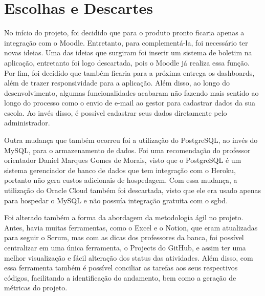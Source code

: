 \section{Escolhas e Descartes}
No início do projeto, foi decidido que para o produto pronto ficaria apenas a integração com o Moodle. Entretanto, para complementá-la, foi necessário ter novas ideias. Uma das ideias que surgiram foi inserir um sistema de boletim na aplicação, entretanto foi logo descartada, pois o Moodle já realiza essa função. Por fim, foi decidido que também ficaria para a próxima entrega os dashboards, além de trazer responsividade para a aplicação. Além disso, ao longo do desenvolvimento, algumas funcionalidades acabaram não fazendo mais sentido ao longo do processo como o envio de e-mail ao gestor para cadastrar dados da sua escola. Ao invés disso, é possível cadastrar seus dados diretamente pelo administrador. 

Outra mudança que também ocorreu foi a utilização do PostgreSQL, ao invés do MySQL, para o armazenamento de dados. Foi uma recomendação do professor orientador Daniel Marques Gomes de Morais, visto que o PostgreSQL é um sistema gerenciador de banco de dados que tem integração com o Heroku, portanto não gera custos adicionais de hospedagem. Com essa mudança, a utilização do Oracle Cloud também foi descartada, visto que ele era usado apenas para hospedar o MySQL e não possuía integração gratuita com o \ac{sgbd}.

Foi alterado também a forma da abordagem da metodologia ágil no projeto. Antes, havia muitas ferramentas, como o Excel e o Notion, que eram atualizadas para seguir o Scrum, mas com as dicas dos professores da banca, foi possível centralizar em uma única ferramenta, o Projects do GitHub, e assim ter uma melhor visualização e fácil alteração dos status das atividades. Além disso, com essa ferramenta também é possível conciliar as tarefas aos seus respectivos códigos, facilitando a identificação do andamento, bem como a geração de métricas do projeto.
